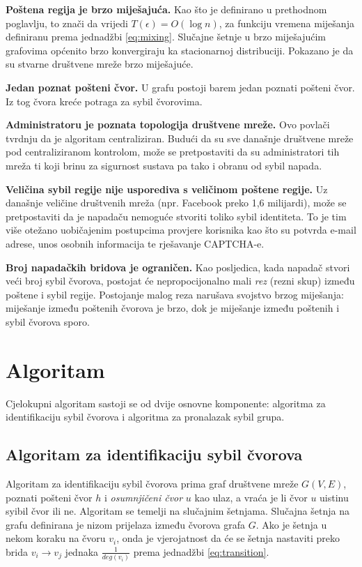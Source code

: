 \documentclass[times, utf8, seminar, numeric]{fer}
\begin{document}
\textbf{Poštena regija je brzo miješajuća.} Kao što je definirano u prethodnom poglavlju, to znači da vrijedi $T(\epsilon) = O(\log n)$, za funkciju vremena miješanja definiranu prema jednadžbi \ref{eq:mixing}. Slučajne šetnje u brzo miješajućim grafovima općenito brzo konvergiraju ka stacionarnoj distribuciji. \cite{sybil-defender} Pokazano je da su stvarne društvene mreže brzo miješajuće. \cite{sybil-limit}

\textbf{Jedan poznat pošteni čvor.} U grafu postoji barem jedan poznati pošteni čvor. Iz tog čvora kreće potraga za sybil čvorovima.

\textbf{Administratoru je poznata topologija društvene mreže.} Ovo povlači tvrdnju da je algoritam centraliziran. Budući da su sve današnje društvene mreže pod centraliziranom kontrolom, može se pretpostaviti da su administratori tih mreža ti koji brinu za sigurnost sustava pa tako i obranu od sybil napada.

\textbf{Veličina sybil regije nije usporediva s veličinom poštene regije.} Uz današnje veličine društvenih mreža (npr. Facebook preko 1,6 milijardi), može se pretpostaviti da je napadaču nemoguće stvoriti toliko sybil identiteta. To je tim više otežano uobičajenim postupcima provjere korisnika kao što su potvrda e-mail adrese, unos osobnih informacija te rješavanje CAPTCHA-e.

\textbf{Broj napadačkih bridova je ograničen.} Kao posljedica, kada napadač stvori veći broj sybil čvorova, postojat će nepropocijonalno mali \textit{rez} (rezni skup) između poštene i sybil regije. Postojanje malog reza narušava svojstvo brzog miješanja: miješanje između poštenih čvorova je brzo, dok je miješanje između poštenih i sybil čvorova sporo.

\section{Algoritam}
Cjelokupni algoritam sastoji se od dvije osnovne komponente: algoritma za identifikaciju sybil čvorova i algoritma za pronalazak sybil grupa.

\subsection{Algoritam za identifikaciju sybil čvorova}
Algoritam za identifikaciju sybil čvorova prima graf društvene mreže $G(V, E)$, poznati pošteni čvor $h$ i \textit{osumnjičeni čvor}  $u$ kao ulaz, a vraća je li čvor $u$ uistinu syibil čvor ili ne. Algoritam se temelji na slučajnim šetnjama. Slučajna šetnja na grafu definirana je nizom prijelaza između čvorova grafa $G$. Ako je šetnja u nekom koraku na čvoru $v_i$, onda je vjerojatnost da će se šetnja nastaviti preko brida $v_i \to v_j$ jednaka $\frac{1}{deg(v_i)}$ prema jednadžbi \ref{eq:transition}.
\end{document}
